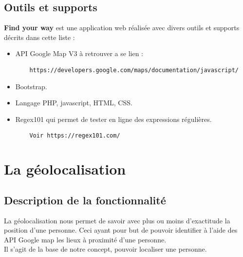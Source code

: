 \documentclass[10pt,a4paper]{report}
\begin{document}
\subsection{Outils et supports}

\begin{flushleft}
\textbf{Find your way} est une application web réalisée avec divers outils et supports décrits dans cette liste :

\begin{itemize}

\item API Google Map V3 à retrouver a se lien :
\begin{verbatim}
	https://developers.google.com/maps/documentation/javascript/
\end{verbatim} 

\item Bootstrap.

\item Langage PHP, javascript, HTML, CSS. 

\item Regex101 qui permet de tester en ligne des expressions régulières.
\begin{verbatim}
	Voir https://regex101.com/ 
\end{verbatim}

\end{itemize}
\end{flushleft}


\section{La géolocalisation}

\subsection{Description de la fonctionnalité}
\begin{flushleft}
La géolocalisation nous permet de savoir avec plus ou moins d'exactitude la position d'une personne. Ceci ayant pour but de pouvoir identifier à l'aide des API Google map les lieux à proximité d'une personne. \\

Il s'agit de la base de notre concept, pouvoir localiser une personne.
\end{flushleft}
\end{document}
